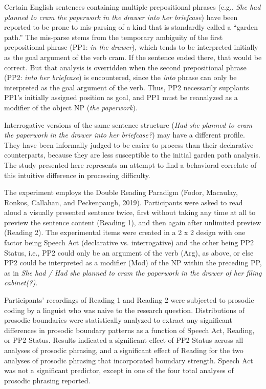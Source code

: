 \documentclass[11pt,oneside]{book}
\begin{document}
Certain English sentences containing multiple prepositional phrases (e.g., \textit{She had planned to cram the paperwork in the drawer into her briefcase}) have been reported to be prone to mis-parsing of a kind that is standardly called a “garden path.” The mis-parse stems from the temporary ambiguity of the first prepositional phrase (PP1: \textit{in the drawer}), which tends to be interpreted initially as the goal argument of the verb cram. If the sentence ended there, that would be correct. But that analysis is overridden when the second prepositional phrase (PP2: \textit{into her briefcase}) is encountered, since the \textit{into} phrase can only be interpreted as the goal argument of the verb. Thus, PP2 necessarily supplants PP1’s initially assigned position as goal, and PP1 must be reanalyzed as a modifier of the object NP (\textit{the paperwork}).  

Interrogative versions of the same sentence structure (\textit{Had she planned to cram the paperwork in the drawer into her briefcase?}) may have a different profile. They have been informally judged to be easier to process than their declarative counterparts, because they are less susceptible to the initial garden path analysis. The study presented here represents an attempt to find a behavioral correlate of this intuitive difference in processing difficulty.

The experiment employs the Double Reading Paradigm (Fodor, Macaulay, Ronkos, Callahan, and Peckenpaugh, 2019). Participants were asked to read aloud a visually presented sentence twice, first without taking any time at all to preview the sentence content (Reading 1), and then again after unlimited preview (Reading 2). The experimental items were created in a 2 x 2 design with one factor being Speech Act (declarative vs. interrogative) and the other being PP2 Status, i.e., PP2 could only be an argument of the verb (Arg), as above, or else PP2 could be interpreted as a modifier (Mod) of the NP within the preceding PP, as in \textit{She had / Had she planned to cram the paperwork in the drawer of her filing cabinet(?)}.  

Participants' recordings of Reading 1 and Reading 2 were subjected to prosodic coding by a linguist who was naive to the research question. Distributions of prosodic boundaries were statistically analyzed to extract any significant differences in prosodic boundary patterns as a function of Speech Act, Reading, or PP2 Status. Results indicated a significant effect of PP2 Status across all analyses of prosodic phrasing, and a significant effect of Reading for the two analyses of prosodic phrasing that incorporated boundary strength. Speech Act was not a significant predictor, except in one of the four total analyses of prosodic phrasing reported.    
\end{document}
